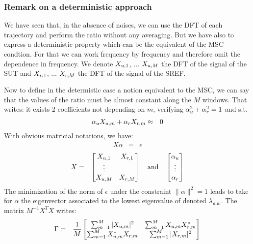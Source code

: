 

\subsubsection{Remark on a deterministic approach}
\label{ann:deterministic-approach}
We have seen that, in the absence of noises, we can use the DFT of each trajectory and perform the ratio without any averaging. But we have also to express a deterministic property which can be the equivalent of the MSC condtion. For that we can work frequency by frequency and therefore omit the dependence in frequency. We denote $X_{{u},1}$, $\ldots$ 
 $X_{{u},M}$ the DFT of the signal of the SUT and $X_{{r},1}$, $\ldots$ 
 $X_{{r},M}$ the DFT of the signal of the SREF.

Now to define in the determistic case a notion equivalent to the MSC, we can say that the values of the ratio must be almost constant along the $M$ windows. That writes: it exists 2 coefficients   not depending on $m$, verifying $\alpha_{{u}}^2+\alpha_{{r}}^2=1$ and s.t. 
\begin{eqnarray} 
\label{eq:approx}
 \alpha_{{u}}X_{{u},m}+\alpha_{{r}}X_{{r},m}&\approx &0
\end{eqnarray}
With obvious matricial notations, we have:
\begin{eqnarray*}
 X \alpha &=& \epsilon
\end{eqnarray*}
\begin{eqnarray*}
X & = &
\begin{bmatrix}
X_{{u},1}&X_{{r},1}
\\
\vdots
\\
X_{{u},M}&X_{{r},M}
\end{bmatrix} 
\quad\mathrm{and}\quad
\begin{bmatrix} 
\alpha_{{u}}
\\
\vdots
\\
\alpha_{{r}}
\end{bmatrix} 
\end{eqnarray*}
The minimization of the norm of $\epsilon$ under the constraint $\|\alpha\|^2=1$ leads to take for $\alpha$ the eigenvector associated to the lowest eigenvalue of denoted $\lambda_{\min}$. The matrix $M^{-1}X^TX$  writes:
\begin{eqnarray*}
\Gamma&=&\frac{1}{M}
 \begin{bmatrix}
\sum_{m=1}^M |X_{{u},m}|^2&\sum_{m=1}^M X_{{u},m}X_{{r},m}^*
\\
\sum_{m=1}^M X_{{u},m}^*X_{{r},m}&\sum_{m=1}^M |X_{{r},m}|^2
\end{bmatrix}
\end{eqnarray*}

